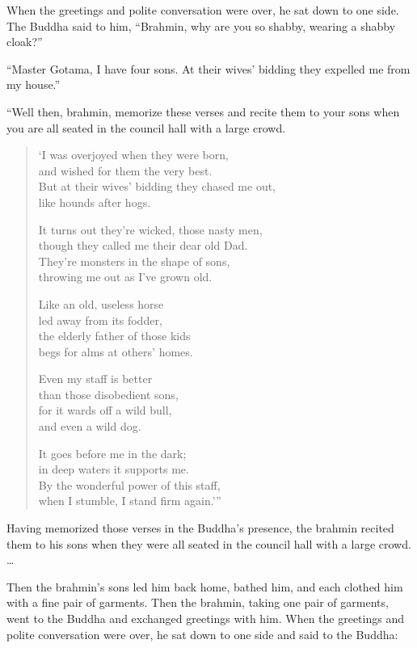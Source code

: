 \documentclass[12pt,openany]{book}%
\begin{document}
When the greetings and polite conversation were over, he sat down to one side. The Buddha said to him, “Brahmin, why are you so shabby, wearing a shabby cloak?” 

“Master Gotama, I have four sons. At their wives’ bidding they expelled me from my house.” 

“Well then, brahmin, memorize these verses and recite them to your sons when you are all seated in the council hall with a large crowd. 

\begin{verse}%
‘I was overjoyed when they were born, \\
and wished for them the very best. \\
But at their wives’ bidding they chased me out, \\
like hounds after hogs. 

It turns out they’re wicked, those nasty men, \\
though they called me their dear old Dad. \\
They’re monsters in the shape of sons, \\
throwing me out as I’ve grown old. 

Like an old, useless horse \\
led away from its fodder, \\
the elderly father of those kids \\
begs for alms at others’ homes. 

Even my staff is better \\
than those disobedient sons, \\
for it wards off a wild bull, \\
and even a wild dog. 

It goes before me in the dark; \\
in deep waters it supports me. \\
By the wonderful power of this staff, \\
when I stumble, I stand firm again.’” 

%
\end{verse}

Having memorized those verses in the Buddha’s presence, the brahmin recited them to his sons when they were all seated in the council hall with a large crowd. … 

Then the brahmin’s sons led him back home, bathed him, and each clothed him with a fine pair of garments. Then the brahmin, taking one pair of garments, went to the Buddha and exchanged greetings with him. When the greetings and polite conversation were over, he sat down to one side and said to the Buddha: 
\end{document}
